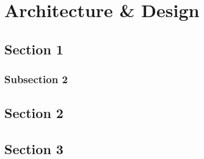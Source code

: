 \chapter{Architecture \& Design}

\section{Section 1}

\subsection{Subsection 2}

\section{Section 2}

\section{Section 3}
